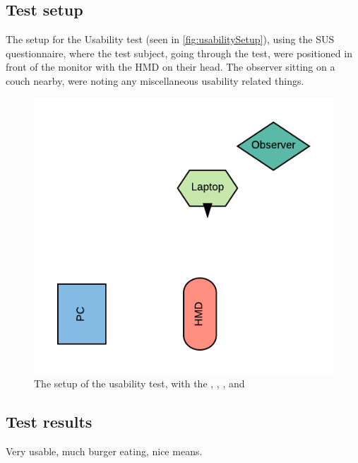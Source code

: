 \subsection{Test setup}
    The setup for the Usability test (seen in \autoref{fig:usabilitySetup}), using the SUS questionnaire, where the test subject, going through the test, were positioned in front of the monitor with the HMD on their head. The observer sitting on a couch nearby, were noting any miscellaneous usability related things.
\begin{figure}[H]
    \centering
    \includegraphics[width=0.6\linewidth]{figure/Design/UsabilitySetup.png}
    \caption{The setup of the usability test, with the \color{red}{HMD/User}, \color{blue}{PC}, \color{teal}{Observer}, and \color{green}{Laptop for SUS}}
    \label{fig:usabilitySetup}
\end{figure}

\subsection{Test results}
    Very usable, much burger eating, nice means.
